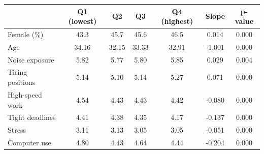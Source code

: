 \begin{tabular}{lcccccc}
\toprule
  & Q1 (lowest) & Q2 & Q3 & Q4 (highest) & Slope & p-value \\
\midrule
\quad Female (\%) & 43.3 & 45.7 & 45.6 & 46.5 & 0.014 & 0.000 \\
\quad Age & 34.16 & 32.15 & 33.33 & 32.91 & -1.001 & 0.000 \\
\quad Noise exposure & 5.82 & 5.77 & 5.80 & 5.85 & 0.029 & 0.004 \\
\quad Tiring positions & 5.14 & 5.10 & 5.14 & 5.27 & 0.071 & 0.000 \\
\quad High-speed work & 4.54 & 4.43 & 4.43 & 4.42 & -0.080 & 0.000 \\
\quad Tight deadlines & 4.41 & 4.38 & 4.35 & 4.17 & -0.137 & 0.000 \\
\quad Stress & 3.11 & 3.13 & 3.05 & 3.05 & -0.051 & 0.000 \\
\quad Computer use & 4.80 & 4.43 & 4.64 & 4.44 & -0.204 & 0.000 \\
\bottomrule
\end{tabular}
